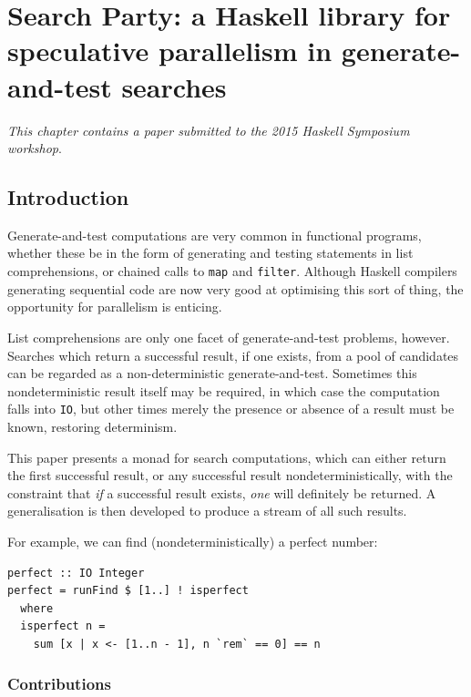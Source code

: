 \chapter{Search Party: a Haskell library for speculative parallelism in
  generate-and-test searches}
\label{chp:searchparty}

\textit{This chapter contains a paper submitted to the 2015 Haskell
  Symposium workshop}\cite{searchparty}.

\section{Introduction}
\label{sec:searchparty-intro}

Generate-and-test computations are very common in functional programs,
whether these be in the form of generating and testing statements in
list comprehensions, or chained calls to \verb|map| and
\verb|filter|. Although Haskell compilers generating sequential code
are now very good at optimising this sort of thing, the opportunity
for parallelism is enticing.

List comprehensions are only one facet of generate-and-test problems,
however. Searches which return a successful result, if one exists,
from a pool of candidates can be regarded as a non-deterministic
generate-and-test. Sometimes this nondeterministic result itself may
be required, in which case the computation falls into \verb|IO|, but
other times merely the presence or absence of a result must be known,
restoring determinism.

This paper presents a monad for search computations, which can either
return the first successful result, or any successful result
nondeterministically, with the constraint that \textit{if} a
successful result exists, \textit{one} will definitely be returned. A
generalisation is then developed to produce a stream of all such
results.

For example, we can find (nondeterministically) a perfect number:

\begin{verbatim}
perfect :: IO Integer
perfect = runFind $ [1..] ! isperfect
  where
  isperfect n =
    sum [x | x <- [1..n - 1], n `rem` == 0] == n
\end{verbatim}

\subsection*{Contributions}

